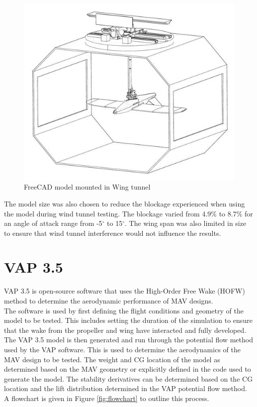 \begin{figure}
    \centering
    \includegraphics{04_Methodology/Figs/ModelWithtunnel.JPG}
    \caption{FreeCAD model mounted in Wing tunnel }
    \label{fig:modelWithTunnel}
\end{figure}

The model size was also chosen to reduce the blockage experienced when using the model during wind tunnel testing. The blockage varied from 4.9\% to 8.7\% for an angle of attack range from -5$^\circ$ to 15$^\circ$. The wing span was also limited in size to ensure that wind tunnel interference would not influence the results. 



\section{VAP 3.5}
VAP 3.5 is open-source software that uses the High-Order Free Wake (\acrshort{HOFW}) method to determine the aerodynamic performance of MAV designs. \\

The software is used by first defining the flight conditions and geometry of the model to be tested. This includes setting the duration of the simulation to ensure that the wake from the propeller and wing have interacted and fully developed. The VAP 3.5 model is then generated and run through the potential flow method used by the VAP software. This is used to determine the aerodynamics of the MAV design to be tested. The weight and CG location of the model as determined based on the MAV geometry or explicitly defined in the code used to generate the model. The stability derivatives can be determined based on the CG location and the lift distribution determined in the VAP potential flow method. A flowchart is given in Figure \ref{fig:flowchart} to outline this process.


